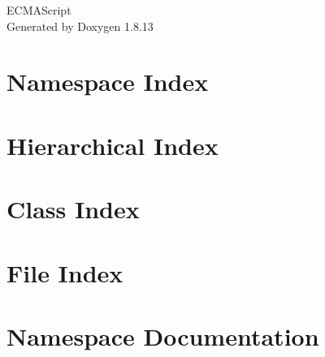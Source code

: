 \documentclass[twoside]{book}
\newcommand{\+}{\discretionary{\mbox{\scriptsize$\hookleftarrow$}}{}{}}
\newcommand{\clearemptydoublepage}{%
  \newpage{\pagestyle{empty}\cleardoublepage}%
}
\begin{document}
\hypersetup{pageanchor=false,
             bookmarksnumbered=true,
             pdfencoding=unicode
            }
\begin{titlepage}
\vspace*{7cm}
\begin{center}%
{\Large E\+C\+M\+A\+Script }\\
\vspace*{1cm}
{\large Generated by Doxygen 1.8.13}\\
\end{center}
\end{titlepage}
\clearemptydoublepage
{}
\tableofcontents
\clearemptydoublepage
{}
\hypersetup{pageanchor=true}

\chapter{Namespace Index}

\chapter{Hierarchical Index}

\chapter{Class Index}

\chapter{File Index}

\chapter{Namespace Documentation}

\end{document}
